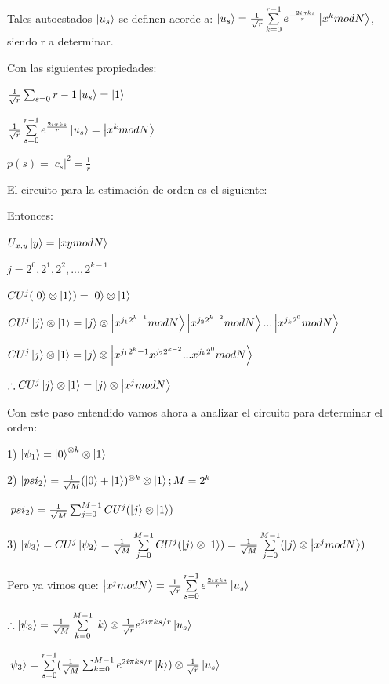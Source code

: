 \documentclass[11pt, spanish]{report}
\begin{document}
Tales autoestados $\ket{u_s}$ se definen acorde a: $\ket{u_s} = \frac{1}{\sqrt{r}} \sum\limits_{k=0}^{r-1} e^{\frac{-2 i \pi k s}{r}} \ket{x^k mod N}$, siendo r a determinar.

Con las siguientes propiedades:

$\frac{1}{\sqrt{r}} \sum_{s=0}{r-1} \ket{u_s} = \ket{1}$

$\frac{1}{\sqrt{r}} \sum\limits_{s=0}^{r-1} e^{\frac{2 i \pi k s}{r}} \ket{u_s} = \ket{x^k mod N}$

$p(s) = |c_s|^2 = \frac{1}{r}$

El circuito para la estimación de orden es el siguiente:


Entonces:

$U_{x,y} \ket{y} = \ket{x y mod N}$

$j = 2^0, 2^1, 2^2, ..., 2^{k-1}$

$CU^j (\ket{0} \otimes \ket{1}) = \ket{0} \otimes \ket{1}$

$CU^j \ket{j} \otimes \ket{1} = \ket{j} \otimes \ket{x^{j_1 2^{k-1}} mod N} \ket{x^{j_2 2^{k-2}} mod N} ... \ket{x^{j_k 2^0} mod N}$

$CU^j \ket{j} \otimes \ket{1} = \ket{j} \otimes \ket{x^{j_1 2^k-1} x^{j_2 2^{k-2}} ... x^{j_k 2^0} mod N}$

$\therefore CU^j \ket{j} \otimes \ket{1} = \ket{j} \otimes \ket{x^j mod N}$

Con este paso entendido vamos ahora a analizar el circuito para determinar el orden:

1) $\ket{\psi_1} = \ket{0}^{\otimes k} \otimes \ket{1}$

2) $\ket{psi_2} = \frac{1}{\sqrt{M}} (\ket{0} + \ket{1})^{\otimes k} \otimes \ket{1}; M=2^k$

$\ket{psi_2} = \frac{1}{\sqrt{M}} \sum_{j=0}^{M-1} CU^j (\ket{j} \otimes \ket{1})$

3) $\ket{\psi_3} = CU^j \ket{\psi_2} = \frac{1}{\sqrt{M}} \sum\limits_{j=0}^{M-1} CU^j (\ket{j} \otimes \ket{1}) = \frac{1}{\sqrt{M}} \sum\limits_{j=0}^{M-1} (\ket{j} \otimes \ket{x^j mod N})$

Pero ya vimos que: $\ket{x^j mod N} = \frac{1}{\sqrt{r}} \sum\limits_{s=0}^{r-1} e^{\frac{2 i \pi k s}{r}} \ket{u_s}$

$\therefore \ket{\psi_3} = \frac{1}{\sqrt{M}} \sum\limits_{k=0}^{M-1} \ket{k} \otimes \frac{1}{\sqrt{r}} e^{2 i \pi k s/r} \ket{u_s}$

$\ket{\psi_3} = \sum\limits_{s=0}^{r-1} (\frac{1}{\sqrt{M}} \sum_{k=0}^{M-1} e^{2 i \pi k s/r} \ket{k}) \otimes \frac{1}{\sqrt{r}} \ket{u_s}$
\end{document}
